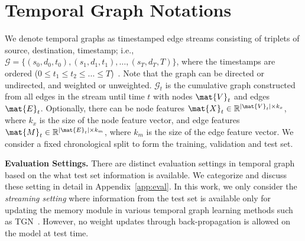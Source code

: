 \section{Temporal Graph Notations}

We denote temporal graphs as timestamped edge streams consisting of triplets of source, destination, timestamp; i.e., $\mathcal{G}=\{ (s_0,d_0,t_0), (s_1,d_1,t_1), \dots , (s_T,d_T,T) \} $, where the timestamps are ordered (\textit{$0 \leq t_1 \leq t_2 \leq ... \leq T $})~\cite{poursafaeitowards,kazemi2020representation}. Note that the graph can be directed or undirected, and weighted or unweighted. $\mathcal{G}_t$ is the cumulative graph constructed from all edges in the stream until time $t$ with nodes $\mat{V}_t$ and edges $\mat{E}_t$. Optionally, there can be node features $\mat{X}_t \in \mathbb{R}^{|\mat{V}_t| \times k_x}$, where $k_x$ is the size of the node feature vector, and edge features $\mat{M}_t \in \mathbb{R}^{|\mat{E}_t| \times k_m}$, where $k_m$ is the size of the edge feature vector. We consider a fixed chronological split to form the training, validation and test set. 



\textbf{Evaluation Settings.} There are distinct evaluation settings in temporal graph based on the what test set information is available. We categorize and discuss these setting in detail in Appendix~\ref{app:eval}. In this work, we only consider the \emph{streaming setting} where information from the test set is available only for updating the memory module in various temporal graph learning methods such as TGN~\cite{rossi2020temporal}. However, no weight updates through back-propagation is allowed on the model at test time. 


